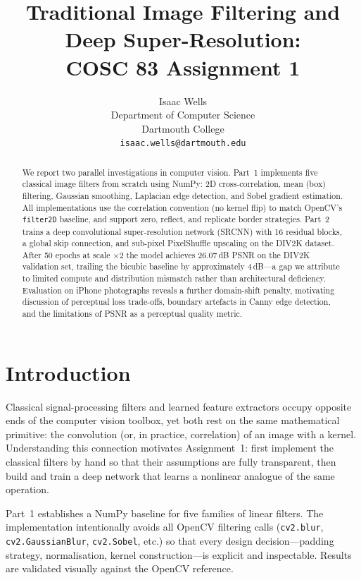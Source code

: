 \documentclass{article}
\title{Traditional Image Filtering and Deep Super-Resolution:\\
       COSC 83 Assignment 1}
\author{%
  Isaac Wells \\
  Department of Computer Science \\
  Dartmouth College \\
  \texttt{isaac.wells@dartmouth.edu}
}
\begin{document}
\maketitle

\begin{abstract}
We report two parallel investigations in computer vision.
Part~1 implements five classical image filters from scratch using NumPy:
2D cross-correlation, mean (box) filtering, Gaussian smoothing, Laplacian
edge detection, and Sobel gradient estimation.
All implementations use the correlation convention (no kernel flip) to match
OpenCV's \texttt{filter2D} baseline, and support zero, reflect, and replicate
border strategies.
Part~2 trains a deep convolutional super-resolution network (SRCNN) with 16
residual blocks, a global skip connection, and sub-pixel PixelShuffle upscaling
on the DIV2K dataset.
After 50 epochs at scale $\times 2$ the model achieves 26.07\,dB PSNR on the
DIV2K validation set, trailing the bicubic baseline by approximately 4\,dB---a
gap we attribute to limited compute and distribution mismatch rather than
architectural deficiency.
Evaluation on iPhone photographs reveals a further domain-shift penalty,
motivating discussion of perceptual loss trade-offs, boundary artefacts in
Canny edge detection, and the limitations of PSNR as a perceptual quality
metric.
\end{abstract}

\section{Introduction}

Classical signal-processing filters and learned feature extractors occupy
opposite ends of the computer vision toolbox, yet both rest on the same
mathematical primitive: the convolution (or, in practice, correlation) of an
image with a kernel.
Understanding this connection motivates Assignment~1: first implement the
classical filters by hand so that their assumptions are fully transparent, then
build and train a deep network that learns a nonlinear analogue of the same
operation.

Part~1 establishes a NumPy baseline for five families of linear filters.
The implementation intentionally avoids all OpenCV filtering calls
(\texttt{cv2.blur}, \texttt{cv2.GaussianBlur}, \texttt{cv2.Sobel}, etc.) so
that every design decision---padding strategy, normalisation, kernel
construction---is explicit and inspectable.
Results are validated visually against the OpenCV reference.
\end{document}

